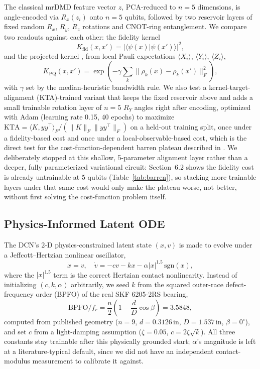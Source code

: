 \documentclass[3p,times,procedia]{elsarticle}
\begin{document}
The classical mrDMD feature vector $z$, PCA-reduced to $n = 5$ dimensions, is angle-encoded via $R_x(z_i)$ onto $n = 5$ qubits, followed by two reservoir layers of fixed random $R_x$, $R_y$, $R_z$ rotations and CNOT-ring entanglement. We compare two readouts against each other: the fidelity kernel
\begin{equation}
K_{\mathrm{fid}}(x, x') = \left|\langle \psi(x) | \psi(x') \rangle\right|^2,
\end{equation}
and the projected kernel \cite{huang2021}, from local Pauli expectations $\langle X_i \rangle$, $\langle Y_i \rangle$, $\langle Z_i \rangle$,
\begin{equation}
K_{\mathrm{PQ}}(x, x') = \exp\!\left( -\gamma \sum_k \|\rho_k(x) - \rho_k(x')\|_F^2 \right),
\end{equation}
with $\gamma$ set by the median-heuristic bandwidth rule. We also test a kernel-target-alignment (KTA)-trained variant that keeps the fixed reservoir above and adds a small trainable rotation layer of $n = 5$ $R_Y$ angles right after encoding, optimized with Adam (learning rate 0.15, 40 epochs) to maximize $\mathrm{KTA} = \langle K, yy^\top \rangle_F / (\|K\|_F \|yy^\top\|_F)$ on a held-out training split, once under a fidelity-based cost and once under a local-observable-based cost, which is the direct test for the cost-function-dependent barren plateau described in \cite{cerezo2021}. We deliberately stopped at this shallow, 5-parameter alignment layer rather than a deeper, fully parameterized variational circuit: Section~6.2 shows the fidelity cost is already untrainable at 5 qubits (Table~\ref{tab:barren}), so stacking more trainable layers under that same cost would only make the plateau worse, not better, without first solving the cost-function problem itself.

\subsection{Physics-Informed Latent ODE}

The DCN's 2-D physics-constrained latent state $(x, v)$ is made to evolve under a Jeffcott--Hertzian nonlinear oscillator,
\begin{equation}
\dot{x} = v, \quad \dot{v} = -cv - kx - \alpha|x|^{1.5}\,\mathrm{sgn}(x),
\end{equation}
where the $|x|^{1.5}$ term is the correct Hertzian contact nonlinearity. Instead of initializing $(c, k, \alpha)$ arbitrarily, we seed $k$ from the squared outer-race defect-frequency order (BPFO) of the real SKF 6205-2RS bearing,
\begin{equation}
\mathrm{BPFO}/f_r = \frac{n}{2}\left(1 - \frac{d}{D}\cos\beta\right) = 3.5848,
\end{equation}
computed from published geometry ($n{=}9$, $d{=}0.3126$\,in, $D{=}1.537$\,in, $\beta{=}0^\circ$), and set $c$ from a light-damping assumption ($\zeta{=}0.05$, $c = 2\zeta\sqrt{k}$). All three constants stay trainable after this physically grounded start; $\alpha$'s magnitude is left at a literature-typical default, since we did not have an independent contact-modulus measurement to calibrate it against.
\end{document}

